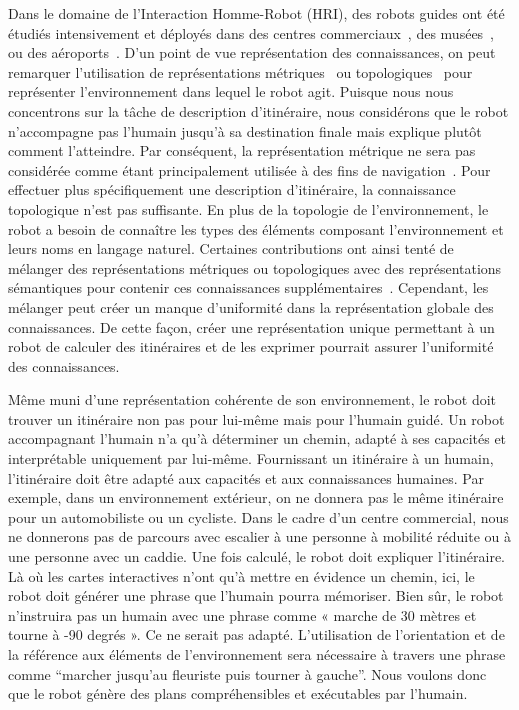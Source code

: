 Dans le domaine de l'Interaction Homme-Robot (HRI), des robots guides ont été étudiés intensivement et déployés dans des centres commerciaux~\cite{okuno_2009_providing}, des musées~\cite{burgard_1999_museum, clodic_2006_rackham, siegwart_2003_robox}, ou des aéroports~\cite{triebel_2016_spencer}. D'un point de vue représentation des connaissances, on peut remarquer l'utilisation de représentations métriques~\cite{thrun_2007_simultaneous} ou topologiques~\cite{morales_2011_modeling} pour représenter l'environnement dans lequel le robot agit. Puisque nous nous concentrons sur la tâche de description d'itinéraire, nous considérons que le robot n'accompagne pas l'humain jusqu'à sa destination finale mais explique plutôt comment l'atteindre. Par conséquent, la représentation métrique ne sera pas considérée comme étant principalement utilisée à des fins de navigation~\cite{thrun_2007_simultaneous}. Pour effectuer plus spécifiquement une description d'itinéraire, la connaissance topologique n'est pas suffisante. En plus de la topologie de l'environnement, le robot a besoin de connaître les types des éléments composant l'environnement et leurs noms en langage naturel. Certaines contributions ont ainsi tenté de mélanger des représentations métriques ou topologiques avec des représentations sémantiques pour contenir ces connaissances supplémentaires~\cite {satake_2015_should, chrastil_2014_cognitive, zender_2008_conceptual}. Cependant, les mélanger peut créer un manque d'uniformité dans la représentation globale des connaissances. De cette façon, créer une représentation unique permettant à un robot de calculer des itinéraires et de les exprimer pourrait assurer l'uniformité des connaissances.

Même muni d'une représentation cohérente de son environnement, le robot doit trouver un itinéraire non pas pour lui-même mais pour l'humain guidé. Un robot accompagnant l'humain n'a qu'à déterminer un chemin, adapté à ses capacités et interprétable uniquement par lui-même. Fournissant un itinéraire à un humain, l'itinéraire doit être adapté aux capacités et aux connaissances humaines. Par exemple, dans un environnement extérieur, on ne donnera pas le même itinéraire pour un automobiliste ou un cycliste. Dans le cadre d'un centre commercial, nous ne donnerons pas de parcours avec escalier à une personne à mobilité réduite ou à une personne avec un caddie. Une fois calculé, le robot doit expliquer l'itinéraire. Là où les cartes interactives n'ont qu'à mettre en évidence un chemin, ici, le robot doit générer une phrase que l'humain pourra mémoriser. Bien sûr, le robot n'instruira pas un humain avec une phrase comme « marche de 30 mètres et tourne à -90 degrés ». Ce ne serait pas adapté. L'utilisation de l'orientation et de la référence aux éléments de l'environnement sera nécessaire à travers une phrase comme ``marcher jusqu'au fleuriste puis tourner à gauche''. Nous voulons donc que le robot génère des plans compréhensibles et exécutables par l'humain.

